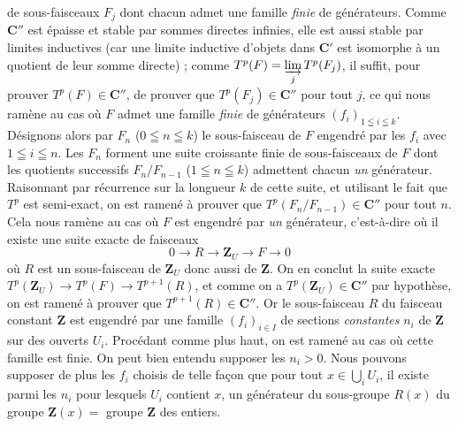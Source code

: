 
\noindent de sous-faisceaux $F_j$ dont chacun admet une famille \textit{finie}
de générateurs.
Comme $\mathbf C''$ est épaisse et stable par sommes directes infinies, elle est aussi
stable par limites inductives (car une limite inductive d'objets dans $\mathbf C'$ est
isomorphe à un quotient de leur somme directe) ; comme
$T^p(F)=\varinjlim\limits_j T^p(F_j)$,
il suffit, pour prouver $T^p(F)\in \mathbf C''$, de prouver que
$T^p(F_j)\in \mathbf C''$ pour tout $j$, ce qui nous ramène au cas où $F$ admet une
famille \textit{finie} de générateurs $(f_i)_{1\leqq i\leqq k}$.
Désignons alors par $F_n$ ($0\leqq n\leqq k$) le sous-faisceau de $F$ engendré
par les $f_i$ avec $1\leqq i\leqq n$. Les $F_n$ forment une suite croissante
finie de sous-faisceaux de $F$ dont les quotients successifs
$F_n/F_{n-1}$ ($1\leqq n\leqq k$) admettent chacun \textit{un} générateur.
Raisonnant par récurrence sur la longueur $k$ de cette suite, et utilisant le
fait que $T^p$ est semi-exact, on est ramené à prouver que
$T^p(F_n/F_{n-1})\in \mathbf C''$ pour tout $n$.
Cela nous ramène au cas où $F$ est engendré par \textit{un} générateur,
c'est-à-dire où il existe une suite exacte de faisceaux
\[
0\to R\to \mathbf Z_U\to F\to0
\]
où $R$ est un sous-faisceau de $\mathbf Z_U$ donc aussi de $\mathbf Z$. On en conclut la suite
exacte
$T^p(\mathbf Z_U)\to T^p(F)\to T^{p+1}(R)$,
et comme on a $T^p(\mathbf Z_U)\in \mathbf C''$ par hypothèse, on est ramené à prouver que
$T^{p+1}(R)\in \mathbf C''$.
Or le sous-faisceau $R$ du faisceau constant $\mathbf Z$ est engendré par une famille
$(f_i)_{i\in I}$ de sections \textit{constantes} $n_i$ de $\mathbf Z$ sur des ouverts
$U_i$. Procédant comme plus haut, on est ramené au cas où cette famille est
finie. On peut bien entendu supposer les $n_i>0$.
Nous pouvons supposer de plus les $f_i$ choisis de telle façon que pour tout
$x\in\bigcup_i U_i$, il existe parmi les $n_i$ pour lesquels $U_i$ contient $x$, un
générateur du sous-groupe $R(x)$ du groupe $\mathbf Z(x)={}$ groupe $\mathbf Z$ des entiers.
